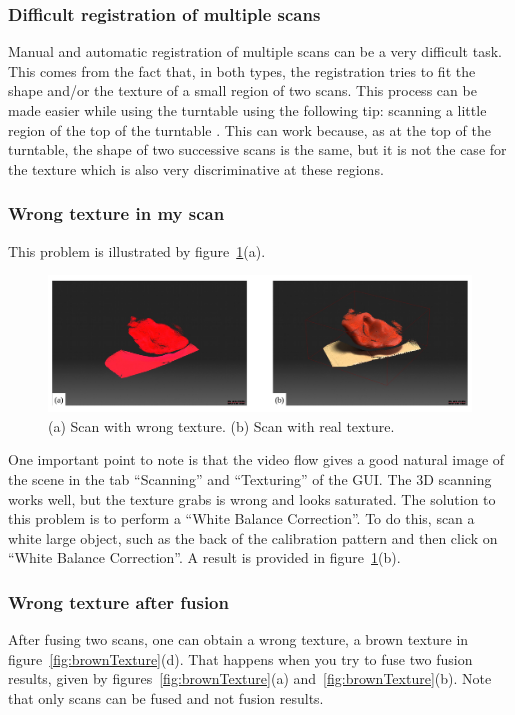 \documentclass[11pt]{article}
\begin{document}
\subsubsection{Difficult registration of multiple scans}
Manual and automatic registration of multiple scans can be a very difficult task.
This comes from the fact that, in both types, the registration tries to fit the shape and/or the texture of a small region of two scans.
This process can be made easier while using the turntable using the following tip: scanning a little region of the top of the turntable .
This can work because, as at the top of the turntable, the shape of two successive scans is the same, but it is not the case for the texture which is also very discriminative at these regions.

\subsubsection{Wrong texture in my scan}
This problem is illustrated by figure~\ref{fig:wrongTexture}(a).

\begin{figure}[h]
\begin{center}
 		\includegraphics[width=15 cm]{images/illustration_wrongTexture.pdf}
 	\end{center}
 	\caption{(a) Scan with wrong texture. (b) Scan with real texture.}
 	\label{fig:wrongTexture}
\end{figure}

One important point to note is that the video flow gives a good natural image of the scene in the tab ``Scanning'' and ``Texturing'' of the GUI.
The 3D scanning works well, but the texture grabs is wrong and looks saturated.
The solution to this problem is to perform a ``White Balance Correction''.
To do this, scan a white large object, such as the back of the calibration pattern and then click on ``White Balance Correction''.
A result is provided in figure~\ref{fig:wrongTexture}(b).

\subsubsection{Wrong texture after fusion}
After fusing two scans, one can obtain a wrong texture, \eg a brown texture in figure~\ref{fig:brownTexture}(d).
That happens when you try to fuse two fusion results, given by figures~\ref{fig:brownTexture}(a) and~\ref{fig:brownTexture}(b).
Note that only scans can be fused and not fusion results.
\end{document}
